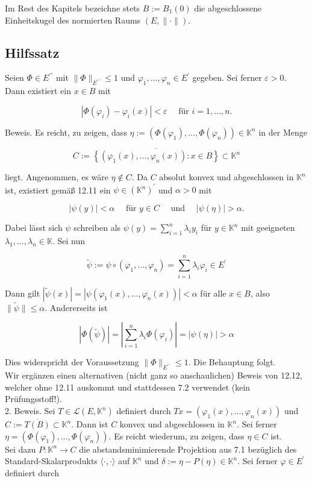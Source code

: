 \documentclass[10pt, letterpaper]{article}
\begin{document}
Im Rest des Kapitels bezeichne stets $B:=B_{1}(0)$ die abgeschlossene Einheitskugel des normierten Raums $(E,\|\cdot\|)$.

\subsection*{Hilfssatz}
Seien $\Phi \in E^{\prime \prime}$ mit $\|\Phi\|_{E^{\prime \prime}} \leq 1$ und $\varphi_{1}, \ldots, \varphi_{n} \in E^{\prime}$ gegeben. Sei ferner $\varepsilon>0$. Dann existiert ein $x \in B$ mit

$$
\left|\Phi\left(\varphi_{i}\right)-\varphi_{i}(x)\right|<\varepsilon \quad \text { für } i=1, \ldots, n .
$$

Beweis. Es reicht, zu zeigen, dass $\eta:=\left(\Phi\left(\varphi_{1}\right), \ldots, \Phi\left(\varphi_{n}\right)\right) \in \mathbb{K}^{n}$ in der Menge

$$
C:=\overline{\left\{\left(\varphi_{1}(x), \ldots, \varphi_{n}(x)\right): x \in B\right\}} \subset \mathbb{K}^{n}
$$

liegt. Angenommen, es wäre $\eta \notin C$. Da $C$ absolut konvex und abgeschlossen in $\mathbb{K}^{n}$ ist, existiert gemäß 12.11 ein $\psi \in\left(\mathbb{K}^{n}\right)^{\prime}$ und $\alpha>0$ mit

$$
|\psi(y)|<\alpha \quad \text { für } y \in C \quad \text { und } \quad|\psi(\eta)|>\alpha .
$$

Dabei lässt sich $\psi$ schreiben als $\psi(y)=\sum_{i=1}^{n} \lambda_{i} y_{i}$ für $y \in \mathbb{K}^{n}$ mit geeigneten $\lambda_{1}, \ldots, \lambda_{n} \in \mathbb{K}$. Sei nun

$$
\widetilde{\psi}:=\psi \circ\left(\varphi_{1}, \ldots, \varphi_{n}\right)=\sum_{i=1}^{n} \lambda_{i} \varphi_{i} \in E^{\prime}
$$

Dann gilt $|\widetilde{\psi}(x)|=\left|\psi\left(\varphi_{1}(x), \ldots, \varphi_{n}(x)\right)\right|<\alpha$ für alle $x \in B$, also $\|\widetilde{\psi}\| \leq \alpha$. Andererseits ist

$$
|\Phi(\widetilde{\psi})|=\left|\sum_{i=1}^{n} \lambda_{i} \Phi\left(\varphi_{i}\right)\right|=|\psi(\eta)|>\alpha
$$

Dies widerspricht der Voraussetzung $\|\Phi\|_{E^{\prime \prime}} \leq 1$. Die Behauptung folgt.\\
Wir ergänzen einen alternativen (nicht ganz so anschaulichen) Beweis von 12.12, welcher ohne 12.11 auskommt und stattdessen 7.2 verwendet (kein Prüfungsstoff!).\\
2. Beweis. Sei $T \in \mathcal{L}\left(E, \mathbb{K}^{n}\right)$ definiert durch $T x=\left(\varphi_{1}(x), \ldots, \varphi_{n}(x)\right)$ und $C:= \overline{T(B)} \subset \mathbb{K}^{n}$. Dann ist $C$ konvex und abgeschlossen in $\mathbb{K}^{n}$. Sei ferner $\eta= \left(\Phi\left(\varphi_{1}\right), \ldots, \Phi\left(\varphi_{n}\right)\right)$. Es reicht wiederum, zu zeigen, dass $\eta \in C$ ist.\\
Sei dazu $P: \mathbb{K}^{n} \rightarrow C$ die abstandsminimierende Projektion aus 7.1 bezüglich des Standard-Skalarprodukts $\langle\cdot, \cdot\rangle$ auf $\mathbb{K}^{n}$ und $\delta:=\eta-P(\eta) \in \mathbb{K}^{n}$. Sei ferner $\varphi \in E^{\prime}$ definiert durch
\end{document}
